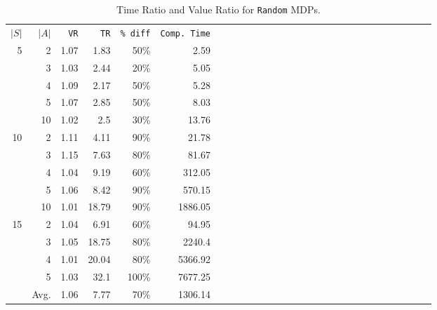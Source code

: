 \begin{table}[h] %
 \setlength{\tabcolsep}{2.5pt}																			
 \renewcommand \arraystretch{1.1}																			
\begin{center}																			
\begin{tabular}{rrrrrrrrrrrrrrrrrrrrrrrrrrrr}																			
$|S|$	&	$|A|$	&		\texttt{VR}		&		\texttt{TR}		&		\texttt{\% diff}		&	\texttt{Comp. Time}			\\
\cmidrule(lr){1-2} \cmidrule(lr){3-3} \cmidrule(lr){4-4}  \cmidrule(lr){5-5}  \cmidrule(lr){6-6}																			
5	&	2	&			1.07	&			1.83	&			50\%	&	2.59			\\
	&	3	&			1.03	&			2.44	&			20\%	&	5.05			\\
	&	4	&			1.09	&			2.17	&			50\%	&	5.28			\\
	&	5	&			1.07	&			2.85	&			50\%	&	8.03			\\
	&	10	&			1.02	&			2.5	&			30\%	&	13.76			\\
\cmidrule(lr){1-2} \cmidrule(lr){3-3} \cmidrule(lr){4-4}  \cmidrule(lr){5-5}  \cmidrule(lr){6-6}																			
10	&	2	&			1.11	&			4.11	&			90\%	&	21.78			\\
	&	3	&			1.15	&			7.63	&			80\%	&	81.67			\\
	&	4	&			1.04	&			9.19	&			60\%	&	312.05			\\
	&	5	&			1.06	&			8.42	&			90\%	&	570.15			\\
	&	10	&			1.01	&			18.79	&			90\%	&	1886.05			\\
\cmidrule(lr){1-2} \cmidrule(lr){3-3} \cmidrule(lr){4-4}  \cmidrule(lr){5-5}  \cmidrule(lr){6-6}																			
15	&	2	&			1.04	&			6.91	&			60\%	&	94.95			\\
	&	3	&			1.05	&			18.75	&			80\%	&	2240.4			\\
	&	4	&			1.01	&			20.04	&			80\%	&	5366.92			\\
	&	5	&			1.03	&			32.1	&			100\%	&	7677.25			\\
\cmidrule(lr){1-2} \cmidrule(lr){3-3} \cmidrule(lr){4-4}  \cmidrule(lr){5-5}  \cmidrule(lr){6-6}																			
	&	Avg.	&			1.06	&			7.77	&			70\%	&	1306.14			
\end{tabular}																			
\end{center}																			
\caption{Time Ratio and Value Ratio for \texttt{Random} MDPs.}														\label{tab:random}					
\end{table} %
